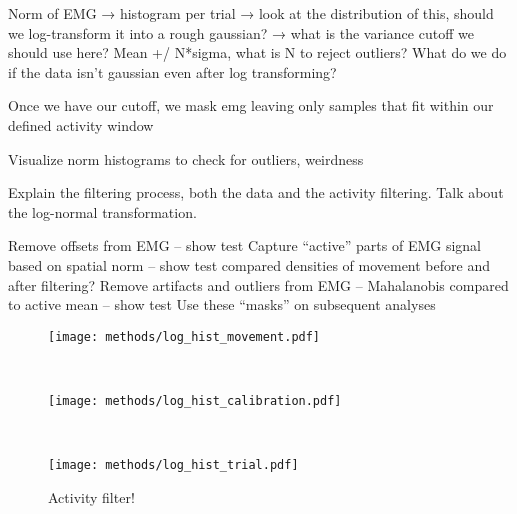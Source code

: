 \documentclass[../main.tex]{subfiles}
\begin{document}
Norm of EMG → histogram per trial → look at the distribution of this, should we log-transform it into a rough gaussian? → what is the variance cutoff we should use here? Mean +/ N*sigma, what is N to reject outliers? What do we do if the data isn’t gaussian even after log transforming?

Once we have our cutoff, we mask emg leaving only samples that fit within our defined activity window

Visualize norm histograms to check for outliers, weirdness

Explain the filtering process, both the data and the activity filtering. Talk about the log-normal transformation.

Remove offsets from EMG – show test
Capture “active” parts of EMG signal based on spatial norm – show test compared densities of movement before and after filtering?
Remove artifacts and outliers from EMG – Mahalanobis compared to active mean – show test
Use these “masks” on subsequent analyses




\begin{figure}[tph]
  \begin{minipage}[b]{\linewidth}
    \centering
    \texttt{[image: methods/log\_hist\_movement.pdf]}
    \subcaption{}
    \vspace{4ex}
  \end{minipage}\\
  \begin{minipage}[b]{\linewidth}
    \centering
    \texttt{[image: methods/log\_hist\_calibration.pdf]}
    \subcaption{}
    \vspace{4ex}
  \end{minipage}\\
  \begin{minipage}[b]{\linewidth}
    \centering
    \texttt{[image: methods/log\_hist\_trial.pdf]}
    \subcaption{}
    \vspace{4ex}
  \end{minipage}
  \caption[Log transforming EMG]{Activity filter!}\label{fig:log_hist}
\end{figure}
\end{document}
